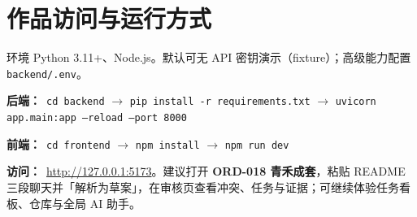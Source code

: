\documentclass[a4paper]{ctexart}
\begin{document}
\section*{作品访问与运行方式}
环境 Python 3.11+、Node.js。默认可无 API 密钥演示（fixture）；高级能力配置 \texttt{backend/.env}。

\noindent\textbf{后端：}\ \texttt{cd backend} $\rightarrow$ \texttt{pip install -r requirements.txt} $\rightarrow$ \texttt{uvicorn app.main:app --reload --port 8000}

\noindent\textbf{前端：}\ \texttt{cd frontend} $\rightarrow$ \texttt{npm install} $\rightarrow$ \texttt{npm run dev}

\noindent\textbf{访问：}\ \url{http://127.0.0.1:5173}。建议打开 \textbf{ORD-018 青禾成套}，粘贴 README 三段聊天并「解析为草案」，在审核页查看冲突、任务与证据；可继续体验任务看板、仓库与全局 AI 助手。
\end{document}
